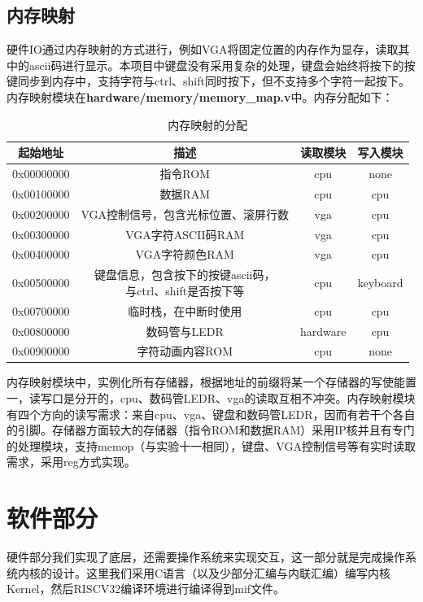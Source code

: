 \documentclass[]{article}
\begin{document}
  \subsection{内存映射}
  硬件IO通过内存映射的方式进行，例如VGA将固定位置的内存作为显存，读取其中的ascii码进行显示。本项目中键盘没有采用复杂的处理，键盘会始终将按下的按键同步到内存中，支持字符与ctrl、shift同时按下，但不支持多个字符一起按下。内存映射模块在\textbf{hardware/memory/memory\_map.v}中。内存分配如下：
  \begin{table}[h!]
      \centering
      \begin{tabular}{c|c|c|c}
            \hline
           起始地址 & 描述 & 读取模块 & 写入模块 \\
           \hline
           0x00000000 & 指令ROM & cpu & none\\
           0x00100000 & 数据RAM & cpu & cpu\\
           0x00200000 & VGA控制信号，包含光标位置、滚屏行数 & vga & cpu \\
           0x00300000 & VGA字符ASCII码RAM & vga & cpu \\
           0x00400000 & VGA字符颜色RAM & vga & cpu \\
           0x00500000 & \makecell{键盘信息，包含按下的按键ascii码，\\与ctrl、shift是否按下等} & cpu & keyboard \\
           0x00700000 & 临时栈，在中断时使用 & cpu & cpu \\
           0x00800000 & 数码管与LEDR & hardware & cpu \\
           0x00900000 & 字符动画内容ROM & cpu & none \\
           \hline
      \end{tabular}
      \caption{内存映射的分配}
      \label{tab:my_label}
  \end{table}
  
  内存映射模块中，实例化所有存储器，根据地址的前缀将某一个存储器的写使能置一，读写口是分开的，cpu、数码管LEDR、vga的读取互相不冲突。内存映射模块有四个方向的读写需求：来自cpu、vga、键盘和数码管LEDR，因而有若干个各自的引脚。存储器方面较大的存储器（指令ROM和数据RAM）采用IP核并且有专门的处理模块，支持memop（与实验十一相同），键盘、VGA控制信号等有实时读取需求，采用reg方式实现。
  \section{软件部分}
  硬件部分我们实现了底层，还需要操作系统来实现交互，这一部分就是完成操作系统内核的设计。这里我们采用C语言（以及少部分汇编与内联汇编）编写内核Kernel，然后RISCV32编译环境进行编译得到mif文件。
  
\end{document}
